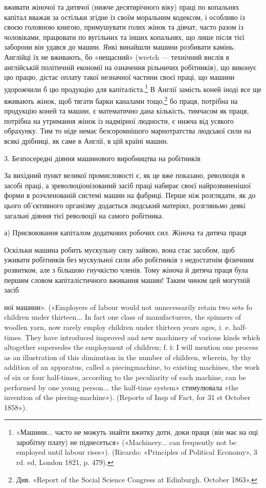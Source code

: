 вживати жіночої та дитячої (нижче десятирічного віку) праці по
копальнях капітал вважав за остільки згідне із своїм моральним
кодексом, і особливо із своєю головною книгою, примушувати
голих жінок та дівчат, часто разом із чоловіками, працювати по
вугільних та інших копальнях, що лише після тієї заборони він
удався до машин. Янкі винайшли машини розбивати камінь.
Англійці їх не вживають, бо «нещасний» (wretch — технічний
вислів в англійській політичній економії на означення рільничих
робітників), що виконує цю працю, дістає оплату такої
незначної частини своєї праці, що машини удорожчили б цю
продукцію для капіталіста.\footnote{
«Машини... часто не можуть знайти вжитку доти, доки праця (він
має на оці заробітну плату) не піднесеться» («Machinery... can frequently
not be employed until labour rises»). (Ricardo: «Principles of
Political Economy», 3 rd. ed, London 1821, p. 479).
} В Англії замість коней іноді все
ще вживають жінок, щоб тягати барки каналами тощо,\footnote{
Див. «Report of the Social Science Congress at Edinburgh. October
1863».
} бо
праця, потрібна на продукцію коней та машин, є математично
дана кількість, тимчасом як праця, потрібна на утримання жінок
із надмірної людности, є нижча від усякого обрахунку. Тим то
ніде немає безсоромнішого марнотратства людської сили на всякі
дрібниці, як саме в Англії, в цій країні машин.

3. Безпосередні діяння машинового виробництва на робітників

За вихідний пункт великої промисловості є, як це вже
показано, революція в засобі праці, а зреволюціонізований засіб
праці набирає своєї найрозвиненішої форми в розчленованій
системі машин на фабриці. Перше ніж розглядати, як до цього
об’єктивного організму додається людський матеріял, розгляньмо
деякі загальні діяння тієї революції на самого робітника.

а) Присвоювання капіталом додаткових робочих
сил. Жіноча та дитяча праця

Оскільки машина робить мускульну силу зайвою, вона стає
засобом, щоб уживати робітників без мускульної сили або робітників
з недостатнім фізичним розвитком, але з більшою гнучкістю
членів. Тому жіноча й дитяча праця була першим словом капіталістичного
вживання машин! Таким чином цей могутній засіб

ної машини». («Employers of labour would not unnecessarily retain two sets
fo children under thirteen... In fact one class of manufacturers, the spinners
of woollen yarn, now rarely employ children under thirteen years ages, i. e.
half-times. They have introduced improved and new machinery of various
kinds which altogether supersedes the employment of children; f. і: I will
mention one process as an illustration of this diminution in the number
of children, wherein, by thy addition of an apparatus, called a piecingmachine,
to existing machines, the work of six or four half-times, according
to the peculiarity of each machine, can be performed by one young
person... the half-time system» стимулювала «the invention of the
piecing-machine»). (Reports of Insp of Fact, for 31 st October 1858»).
\parbreak{}  %
